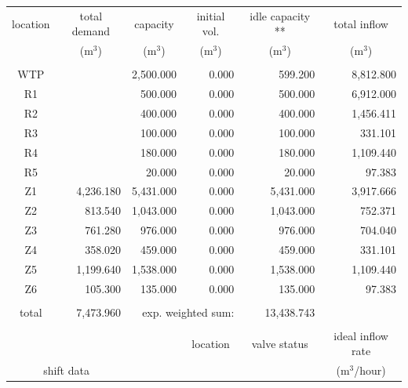 \documentclass{singlecol}
\theoremstyle{TH}{
\newtheorem{lemma}{Lemma}
\newtheorem{theorem}[lemma]{Theorem}
\newtheorem{corrolary}[lemma]{Corrolary}
\newtheorem{conjecture}[lemma]{Conjecture}
\newtheorem{proposition}[lemma]{Proposition}
\newtheorem{claim}[lemma]{Claim}
\newtheorem{stheorem}[lemma]{Wrong Theorem}
\newtheorem{algorithm}{Algorithm}
}
\theoremstyle{THrm}{
\newtheorem{definition}{Definition}[section]
\newtheorem{question}{Question}[section]
\newtheorem{remark}{Remark}
\newtheorem{scheme}{Scheme}
}
\theoremstyle{THhit}{
\newtheorem{case}{Case}[section]
}
\begin{document}
\begin{table}[h!]
\begin{center}
\begin{small}
	\begin{tabular}{ c r r r r r } 
		location & \multicolumn{1}{c}{total demand}      & \multicolumn{1}{c}{capacity} & \multicolumn{1}{c}{initial vol.} & \multicolumn{1}{c}{idle capacity **} & \multicolumn{1}{c}{total inflow}  \\
		      & \multicolumn{1}{c}{($\mathrm{m^3}$)} & \multicolumn{1}{c}{($\mathrm{m^3}$)}   & \multicolumn{1}{c}{($\mathrm{m^3}$)}     &  \multicolumn{1}{c}{($\mathrm{m^3}$)}   &  \multicolumn{1}{c}{($\mathrm{m^3}$)}               \\
		\\
		WTP   &           & 2,500.000 & 0.000 &  599.200 & 8,812.800 \\
		R1    &           &   500.000 & 0.000 &  500.000 & 6,912.000\\
		R2    &           &   400.000 & 0.000 &  400.000 & 1,456.411 \\
		R3    &           &   100.000 & 0.000 &  100.000 &   331.101 \\
	    R4    &           &   180.000 & 0.000 &  180.000 & 1,109.440  \\
	    R5    &           &    20.000 & 0.000 &   20.000 &    97.383 \\
	    Z1    & 4,236.180 & 5,431.000 & 0.000 &  5,431.000 & 3,917.666 \\
	    Z2    &   813.540 & 1,043.000 & 0.000 &  1,043.000 &   752.371 \\
	    Z3    &   761.280 &   976.000 & 0.000 &    976.000 &   704.040 \\
	    Z4    &   358.020 &   459.000 & 0.000 &    459.000 &   331.101 \\
	    Z5    & 1,199.640 & 1,538.000 & 0.000 &  1,538.000 & 1,109.440 \\
	    Z6    &   105.300 &   135.000 & 0.000 &    135.000 &    97.383 \\
	    \\
	    total & 7,473.960 & \multicolumn{2}{r}{exp. weighted sum:} & 13,438.743 &              \\
		   \\
		&  &      &  \multicolumn{1}{c}{location}    & \multicolumn{1}{c}{valve status} & \multicolumn{1}{c}{ideal inflow rate}   \\
		\multicolumn{2}{c}{shift data}     &   &      & \multicolumn{1}{c}{} & \multicolumn{1}{c}{($\mathrm{m^3}$/hour)} \\

\end{tabular}
\end{small}
\end{center}
\end{table}
\end{document}
